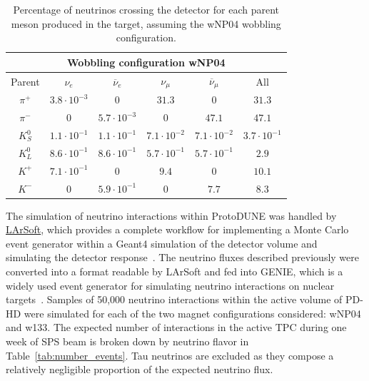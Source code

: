 \begin{table}[h]
\centering
\begin{tabular}{|c|c|c|c|c|c|}
\hline
\multicolumn{6}{|c|}{Wobbling configuration wNP04}\\
\hline
\hline
Parent & $\nu_e$ & $\overline{\nu}_e$ & $\nu_\mu$ & $\overline{\nu}_\mu$ & All \\
\hline
$\pi^+$ & $3.8\cdot 10^{-3}$ & $0$ & $31.3$ & $0$ & $31.3$ \\ 
$\pi^-$ & 0 & $5.7\cdot 10^{-3}$ & $0$ & $47.1$ & $47.1$ \\ 
$K^0_S$ & $1.1\cdot 10^{-1}$ & $1.1 \cdot 10^{-1}$ & $7.1 \cdot 10^{-2}$ & $7.1 \cdot 10^{-2}$ & $3.7 \cdot 10^{-1}$ \\ 
$K^0_L$ & $8.6\cdot 10^{-1}$ & $8.6 \cdot 10^{-1}$ & $5.7 \cdot 10^{-1}$ & $5.7 \cdot 10^{-1}$ & $2.9$ \\ 
$K^+$ & $7.1\cdot 10^{-1}$ & $0$ & $9.4$ & $0$ & $10.1$ \\ 
$K^-$ & $0$ & $5.9\cdot 10^{-1}$ & $0$ & $7.7$ & $8.3$ \\ 
\hline
\end{tabular}
\caption{Percentage of neutrinos crossing the detector for each parent meson produced in the target, assuming the wNP04 wobbling configuration.}
\label{tab:light_nu_wnp04}
\end{table}


The simulation of neutrino interactions within ProtoDUNE was handled by \href{https://larsoft.org/}{LArSoft}, which provides a complete workflow for implementing a Monte Carlo event generator within a Geant4 simulation of the detector volume and simulating the detector response~\cite{LArSoft, Church:2013hea}. The neutrino fluxes described previously were converted into a format readable by LArSoft and fed into GENIE, which is a widely used event generator for simulating neutrino interactions on nuclear targets~\cite{GENIE}. Samples of 50,000 neutrino interactions within the active volume of PD-HD were simulated for each of the two magnet configurations considered: wNP04 and w133. The expected number of interactions in the active TPC during one week of SPS beam is broken down by neutrino flavor in Table~\ref{tab:number_events}. Tau neutrinos are excluded as they compose a relatively negligible proportion of the expected neutrino flux.

